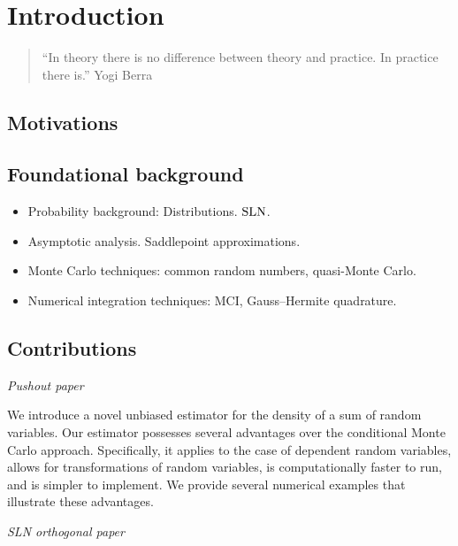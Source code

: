 \chapter{Introduction}

\setcounter{page}{1}

\begin{quote}
``In theory there is no difference between theory and practice. In practice there is.'' Yogi Berra
\end{quote}

\section{Motivations}

\section{Foundational background}

\begin{itemize}
	\item Probability background: Distributions. $\mathrm{SLN}$.
	\item Asymptotic analysis. Saddlepoint approximations.
	\item Monte Carlo techniques: common random numbers, quasi-Monte Carlo.
	\item Numerical integration techniques: MCI, Gauss--Hermite quadrature.
\end{itemize}


\section{Contributions}

\emph{Pushout paper}

We introduce a novel unbiased estimator for the density of a sum of random variables. Our estimator possesses several advantages over the conditional Monte Carlo approach. Specifically, it  applies to the case of dependent random variables, 
allows for transformations of random variables, is computationally faster to run, and is simpler to implement. We provide several numerical examples that illustrate these advantages. 

\emph{SLN orthogonal paper}


